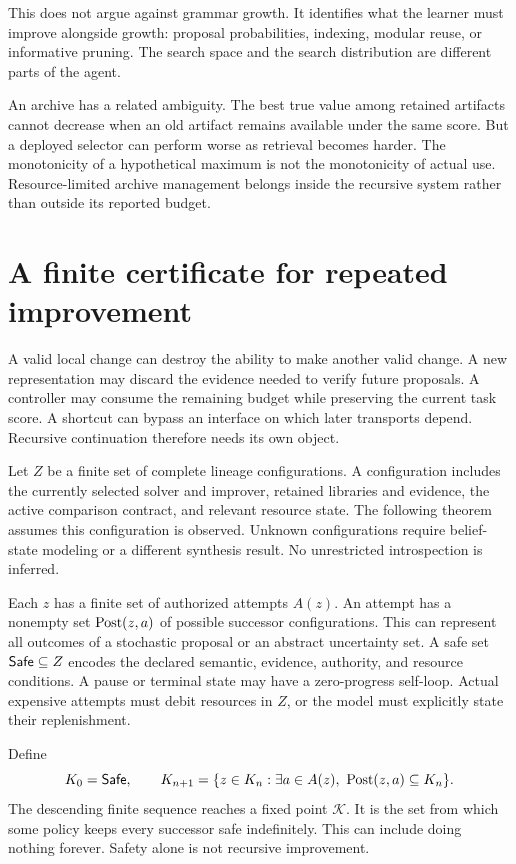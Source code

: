 This does not argue against grammar growth. It identifies what the learner must improve alongside growth: proposal probabilities, indexing, modular reuse, or informative pruning. The search space and the search distribution are different parts of the agent.

An archive has a related ambiguity. The best true value among retained artifacts cannot decrease when an old artifact remains available under the same score. But a deployed selector can perform worse as retrieval becomes harder. The monotonicity of a hypothetical maximum is not the monotonicity of actual use. Resource-limited archive management belongs inside the recursive system rather than outside its reported budget.

\section{A finite certificate for repeated improvement}\label{SII:sec:recursion}
A valid local change can destroy the ability to make another valid change. A new representation may discard the evidence needed to verify future proposals. A controller may consume the remaining budget while preserving the current task score. A shortcut can bypass an interface on which later transports depend. Recursive continuation therefore needs its own object.

Let $Z$ be a finite set of complete lineage configurations. A configuration includes the currently selected solver and improver, retained libraries and evidence, the active comparison contract, and relevant resource state. The following theorem assumes this configuration is observed. Unknown configurations require belief-state modeling or a different synthesis result. No unrestricted introspection is inferred.

Each $z$ has a finite set of authorized attempts $A(z)$. An attempt has a nonempty set $\operatorname{Post}(z,a)$ of possible successor configurations. This can represent all outcomes of a stochastic proposal or an abstract uncertainty set. A safe set $\mathsf{Safe}\subseteq Z$ encodes the declared semantic, evidence, authority, and resource conditions. A pause or terminal state may have a zero-progress self-loop. Actual expensive attempts must debit resources in $Z$, or the model must explicitly state their replenishment.

Define
\[
K_0=\mathsf{Safe},\qquad
K_{n+1}=\{z\in K_n:\exists a\in A(z),\ \operatorname{Post}(z,a)\subseteq K_n\}.
\]
The descending finite sequence reaches a fixed point $\mathcal K$. It is the set from which some policy keeps every successor safe indefinitely. This can include doing nothing forever. Safety alone is not recursive improvement.


